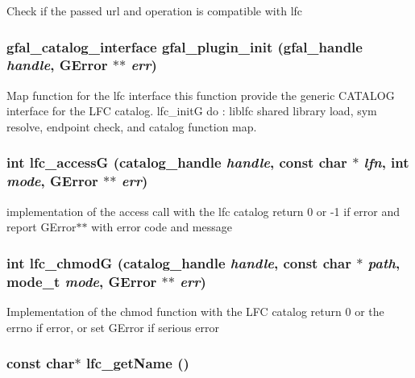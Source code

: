 Check if the passed url and operation is compatible with lfc 
\subsubsection{\setlength{\rightskip}{0pt plus 5cm}\bf{gfal\_\-catalog\_\-interface} gfal\_\-plugin\_\-init (gfal\_\-handle {\em handle}, GError $\ast$$\ast$ {\em err})}\label{gfal__common__lfc_8c_5c9edde4d67d96432a319d940a4799f1}


Map function for the lfc interface this function provide the generic CATALOG interface for the LFC catalog. lfc\_\-init\-G do : liblfc shared library load, sym resolve, endpoint check, and catalog function map. 
\subsubsection{\setlength{\rightskip}{0pt plus 5cm}int lfc\_\-access\-G (catalog\_\-handle {\em handle}, const char $\ast$ {\em lfn}, int {\em mode}, GError $\ast$$\ast$ {\em err})}\label{gfal__common__lfc_8c_c5d7bae3ad9aea9f912d6b91f8d5731e}


implementation of the access call with the lfc catalog return 0 or -1 if error and report GError$\ast$$\ast$ with error code and message 
\subsubsection{\setlength{\rightskip}{0pt plus 5cm}int lfc\_\-chmod\-G (catalog\_\-handle {\em handle}, const char $\ast$ {\em path}, mode\_\-t {\em mode}, GError $\ast$$\ast$ {\em err})}\label{gfal__common__lfc_8c_f40927feaad58de76b5406eb828102a6}


Implementation of the chmod function with the LFC catalog return 0 or the errno if error, or set GError if serious error 
\subsubsection{\setlength{\rightskip}{0pt plus 5cm}const char$\ast$ lfc\_\-get\-Name ()}\label{gfal__common__lfc_8c_67715cf749ea720de31abbc67f9f414e}


